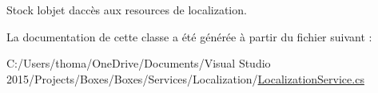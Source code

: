 Stock l\textquotesingle{}objet d\textquotesingle{}accès aux resources de localization. 



La documentation de cette classe a été générée à partir du fichier suivant \+:\begin{DoxyCompactItemize}
\item 
C\+:/\+Users/thoma/\+One\+Drive/\+Documents/\+Visual Studio 2015/\+Projects/\+Boxes/\+Boxes/\+Services/\+Localization/\hyperlink{_localization_service_8cs}{Localization\+Service.\+cs}\end{DoxyCompactItemize}
